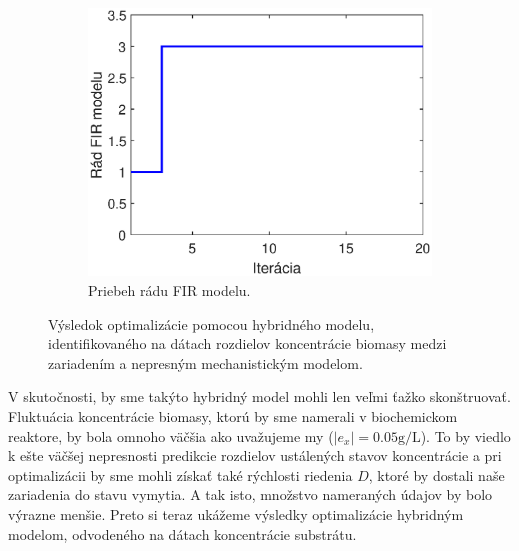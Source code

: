 \begin{figure}
\begin{subfigure}[b]{0.49\textwidth}
	\end{subfigure}
	\bigskip
	\begin{subfigure}[b]{0.49\textwidth}
		\centering
		\includegraphics[width=\linewidth]{images/hybrid_bio_order}
		\caption{Priebeh rádu FIR modelu.}
		\label{fig:hybrid_bio_order}
	\end{subfigure}
	\caption{Výsledok optimalizácie pomocou hybridného modelu, identifikovaného na dátach rozdielov koncentrácie biomasy medzi zariadením a nepresným mechanistickým modelom.}
	\label{fig:hybrid_bio_opt_results}	
\end{figure}

V skutočnosti, by sme takýto hybridný model mohli len veľmi ťažko skonštruovať. Fluktuácia koncentrácie biomasy, ktorú by sme namerali v biochemickom reaktore, by bola omnoho väčšia ako uvažujeme my ($ \left|e_{x}\right| = 0.05\si{\gram\per\liter} $). To by viedlo k ešte väčšej nepresnosti predikcie rozdielov ustálených stavov koncentrácie a pri optimalizácii by sme mohli získať také rýchlosti riedenia $ D $, ktoré by dostali naše zariadenia do stavu vymytia. A tak isto, množstvo nameraných údajov by bolo výrazne menšie. Preto si teraz ukážeme výsledky optimalizácie hybridným modelom, odvodeného na dátach koncentrácie substrátu. 

